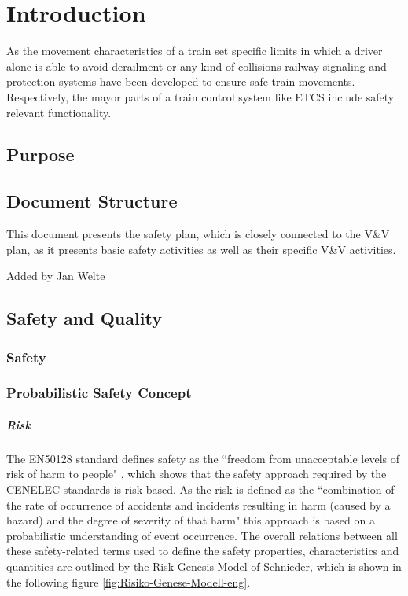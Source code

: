\documentclass{template/openetcs_report}
\begin{document}
\chapter{Introduction}



As the movement characteristics of a train set specific limits in which a driver alone is able to avoid derailment or any kind of collisions railway signaling and protection systems have been developed to ensure safe train movements. Respectively, the mayor parts of a train control system like ETCS include safety relevant functionality. 

\section{Purpose}
\label{sec:purpose}



\section{Document Structure}
\label{sec:document-structure}

This document presents the safety plan, which is closely connected to the V\&V plan, as it presents basic safety activities as well as their specific V\&V activities.

Added by Jan Welte



\section{Safety and Quality}
\label{sec:introduction}



\subsection{Safety}



\subsection{Probabilistic Safety Concept}

\paragraph{Risk}

The EN50128 standard defines safety as the ``freedom from unacceptable levels of risk of harm to people" \cite{EN50128:2011}, which shows that the safety approach required by the CENELEC standards is risk-based. As the risk is defined as the ``combination of the rate of occurrence of accidents and incidents resulting in harm (caused by a hazard) and the degree of severity  of that harm" \cite{EN50128:2011} this approach is based on a probabilistic understanding of event occurrence. The overall relations between all these safety-related terms used to define the safety properties, characteristics and quantities are outlined by the Risk-Genesis-Model of Schnieder, which is shown in the following figure \ref{fig:Risiko-Genese-Modell-eng}.
\end{document}
